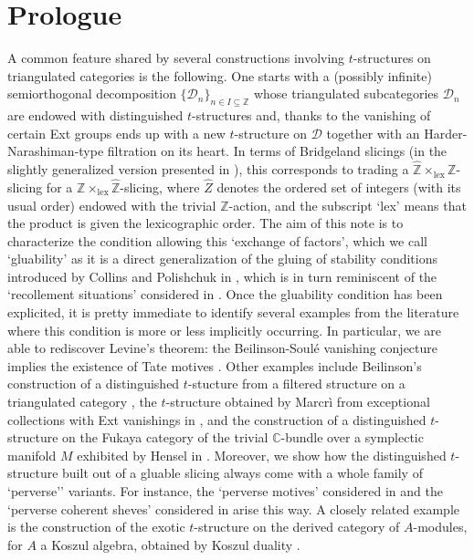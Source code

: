 \documentclass{article}
\theoremstyle{definition}
\newcommand{\Z}{\mathbb{Z}}
\begin{document}
\section{Prologue}
A common feature shared by several constructions involving $t$-structures on triangulated categories is the following. One starts with a (possibly infinite) semiorthogonal decomposition $\{\mathscr{D}_n\}_{n\in I\subseteq \Z}$ whose triangulated subcategories $\mathscr{D}_n$ are endowed with distinguished $t$-structures and, thanks to the vanishing of certain Ext groups ends up with a new $t$-structure on $\mathscr{D}$ together with an Harder-Narashiman-type filtration on its heart. In terms of Bridgeland slicings (in the slightly generalized version presented in \cite{gkr,fosco}), this corresponds to trading a $\hat{\Z}\times_{\mathrm{lex}}\Z$-slicing for a ${\Z}\times_{\mathrm{lex}}\hat{\Z}$-slicing, where $\hat{Z}$ denotes the ordered set of integers (with its usual order) endowed with the trivial $\Z$-action, and the subscript `lex' means that the product is given the lexicographic order. The aim of this note is to characterize the condition allowing this `exchange of factors', which we call `gluability' {\color{red}as it is a direct generalization of the gluing of stability conditions introduced by Collins and Polishchuk in \cite{collins}, which is in turn} reminiscent of the `recollement situations' considered in \cite{bbd}. Once the gluability condition has been explicited, it is pretty immediate to identify several examples from the literature where this condition is more or less implicitly occurring. In particular, we are able to rediscover Levine's theorem: the Beilinson-Soul\'e vanishing conjecture implies the existence of Tate motives \cite{levine}. 
Other examples include Beilinson's construction of a distinguished $t$-stucture from a filtered structure on a triangulated category \cite{beil}, the $t$-structure obtained by Marcr\`i from exceptional collections with Ext vanishings in \cite{macri}, and the construction of a distinguished $t$-structure on the Fukaya category of the trivial $\mathbb{C}$-bundle over a symplectic manifold $M$ exhibited by Hensel in \cite{lagra}. Moreover, we show how the distinguished $t$-structure built out of a gluable slicing always come with a whole family of `perverse'' variants. For instance, the `perverse  motives' considered in \cite{permot} and the `perverse coherent sheves' considered in \cite{bezr} arise this way. A closely related example is the construction of the exotic $t$-structure on the derived category of $A$-modules, for $A$ a Koszul algebra, obtained by Koszul duality \cite{kosz}.
\end{document}
